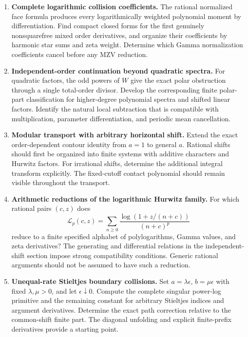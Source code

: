 \begin{enumerate}[label=\textbf{Q\arabic*.},leftmargin=*]
\item \textbf{Complete logarithmic collision coefficients.}
The rational normalized face formula produces every
logarithmically weighted polynomial moment by differentiation.
Find compact closed forms for the first genuinely nonsquarefree
mixed order derivatives, and organize their coefficients by
harmonic star sums and zeta weight. Determine which Gamma
normalization coefficients cancel before any MZV reduction.

\item \textbf{Independent-order continuation beyond quadratic spectra.}
For quadratic factors, the odd powers of \(W\) give the exact
polar obstruction through a single total-order divisor.
Develop the corresponding finite polar-part classification
for higher-degree polynomial spectra and shifted linear
factors. Identify the natural local subtraction that is
compatible with multiplication, parameter differentiation,
and periodic mean cancellation.

\item \textbf{Modular transport with arbitrary horizontal shift.}
Extend the exact order-dependent contour identity from
\(a=1\) to general \(a\). Rational shifts should first be
organized into finite systems with additive characters and
Hurwitz factors. For irrational shifts, determine the
additional integral transform explicitly. The fixed-cutoff
contact polynomial should remain visible throughout the
transport.

\item \textbf{Arithmetic reductions of the logarithmic Hurwitz family.}
For which rational pairs \((c,z)\) does
\[
 \mathcal L_p(c,z)=
 \sum_{n\ge0}\frac{\log(1+z/(n+c))}{(n+c)^p}
\]
reduce to a finite specified alphabet of polylogarithms,
Gamma values, and zeta derivatives?
The generating and differential relations in the
independent-shift section impose strong compatibility
conditions. Generic rational arguments should not be
assumed to have such a reduction.

\item \textbf{Unequal-rate Stieltjes boundary collisions.}
Set \(a=\lambda\epsilon\), \(b=\mu\epsilon\) with fixed
\(\lambda,\mu>0\), and let \(\epsilon\downarrow0\).
Compute the complete singular power-log primitive and
the remaining constant for arbitrary Stieltjes indices
and argument derivatives. Determine the exact path
correction relative to the common-shift finite part.
The diagonal unfolding and explicit finite-prefix
derivatives provide a starting point.


\end{enumerate}
